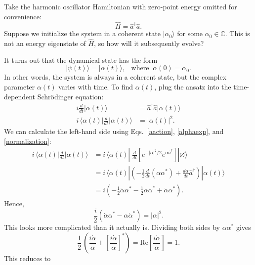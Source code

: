 \documentclass[pra,12pt]{revtex4}
\begin{document}
Take the harmonic oscillator Hamiltonian with zero-point energy
omitted for convenience:
\begin{equation}
  \hat{H} = \hat{a}^\dagger \hat{a}.
\end{equation}
Suppose we initialize the system in a coherent state
$|\alpha_0\rangle$ for some $\alpha_0 \in \mathbb{C}$.  This is not an
energy eigenstate of $\hat{H}$, so how will it subsequently evolve?

It turns out that the dynamical state has the form
\begin{equation}
  |\psi(t)\rangle = |\alpha(t)\rangle, \;\;\;\mathrm{where}\;\;\alpha(0) = \alpha_0.
\end{equation}
In other words, the system is always in a coherent state, but the
complex parameter $\alpha(t)$ varies with time.  To find $\alpha(t)$,
plug the ansatz into the time-dependent Schr\"odinger equation:
\begin{align}
  i \frac{d}{dt} |\alpha(t)\rangle &= \hat{a}^\dagger \hat{a} |\alpha(t)\rangle\\
  i \,\Big\langle\alpha(t)\Big| \frac{d}{dt} \Big|\alpha(t)\Big\rangle &=
  |\alpha(t)|^2.
\end{align}
We can calculate the left-hand side using Eqs.~\eqref{aaction},
\eqref{alphaexp}, and \eqref{normalization}:
\begin{align}
  i \, \Big\langle\alpha(t)\Big| \frac{d}{dt} \Big|\alpha(t)\Big\rangle
  &= i\, \langle \alpha(t) | \; \frac{d}{dt}
  \left[ e^{-|\alpha|^2/2} e^{\alpha\hat{a}^\dagger} \right]
  |\varnothing\rangle \\
  &= i\, \langle \alpha(t) | \left(-\frac{1}{2} \frac{d}{dt}(\alpha\alpha^*)
  + \frac{d\alpha}{dt} \hat{a}^\dagger \right) |\alpha(t)\rangle \\
  &= i \left(-\frac{1}{2} \dot{\alpha}\alpha^*
  - \frac{1}{2}\alpha\dot{\alpha}^* + \dot{\alpha}\alpha^*\right).
\end{align}
Hence,
\begin{equation}
  \frac{i}{2}\left(\dot{\alpha}\alpha^* - \alpha\dot{\alpha}^*\right) = |\alpha|^2.
  \label{eom}
\end{equation}
This looks more complicated than it actually is.  Dividing both sides by
$\alpha \alpha^*$ gives
\begin{equation}
  \frac{1}{2}\, \left(\frac{i\dot{\alpha}}{\alpha} + \left[\frac{i\dot{\alpha}}{\alpha}\right]^*\right) = \mathrm{Re}\left[\frac{i\dot{\alpha}}{\alpha}\right] = 1.
\end{equation}
This reduces to
\end{document}

